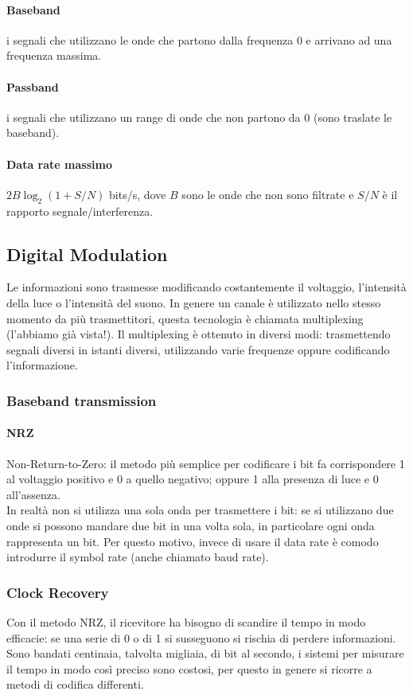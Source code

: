\documentclass{article}
\begin{document}
\paragraph{Baseband} i segnali che utilizzano le onde che partono dalla frequenza
0 e arrivano ad una frequenza massima. 

\paragraph{Passband} i segnali che utilizzano un range di onde che non partono
da 0 (sono traslate le baseband).

\paragraph{Data rate massimo} $2B\log_2(1+S/N)$ bits/s, dove $B$ sono le onde che non
sono filtrate e $S/N$ è il rapporto segnale/interferenza.

\subsection{Digital Modulation}
Le informazioni sono trasmesse modificando costantemente il voltaggio,
l'intensità della luce o l'intensità del suono. In genere un canale è utilizzato
nello stesso momento da più trasmettitori, questa tecnologia è chiamata
multiplexing (l'abbiamo già vista!). Il multiplexing è ottenuto in diversi modi:
trasmettendo segnali diversi in istanti diversi, utilizzando varie frequenze
oppure codificando l'informazione.

\subsubsection{Baseband transmission}
\paragraph{NRZ} Non-Return-to-Zero: il metodo più semplice per codificare i bit 
fa corrispondere 1 al voltaggio positivo e 0 a quello negativo; oppure 1 alla 
presenza di luce e 0 all'assenza.\\
In realtà non si utilizza una sola onda per trasmettere i bit: se si utilizzano
due onde si possono mandare due bit in una volta sola, in particolare ogni onda
rappresenta un bit. Per questo motivo, invece di usare il data rate è comodo
introdurre il symbol rate (anche chiamato baud rate).

\subsubsection{Clock Recovery} Con il metodo NRZ, il ricevitore ha bisogno di
scandire il tempo in modo efficacie: se una serie di 0 o di 1 si susseguono si
rischia di perdere informazioni. Sono bandati centinaia, talvolta migliaia, di
bit al secondo, i sistemi per misurare il tempo in modo così preciso sono
costosi, per questo in genere si ricorre a metodi di codifica differenti.
\end{document}
